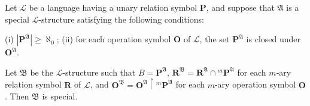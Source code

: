 Let $\mathcal{L}$ be a language having a unary relation symbol $\mathbf{P}$, and suppose that $\mathfrak{A}$ is a special $\mathcal{L}$-structure satisfying the following conditions:

(i) $|\mathbf{P}^{\mathfrak{A}}| \geq \aleph_0$;
(ii) for each operation symbol $\mathbf{O}$ of $\mathcal{L}$, the set $\mathbf{P}^{\mathfrak{A}}$ is closed under $\mathbf{O}^{\mathfrak{A}}$.

Let $\mathfrak{B}$ be the $\mathcal{L}$-structure such that $B = \mathbf{P}^{\mathfrak{A}}$, $\mathbf{R}^{\mathfrak{B}} = \mathbf{R}^{\mathfrak{A}} \cap {}^m\mathbf{P}^{\mathfrak{A}}$ for each $m$-ary relation symbol $\mathbf{R}$ of $\mathcal{L}$, and $\mathbf{O}^{\mathfrak{B}} = \mathbf{O}^{\mathfrak{A}} \upharpoonright {}^m\mathbf{P}^{\mathfrak{A}}$ for each $m$-ary operation symbol $\mathbf{O}$. Then $\mathfrak{B}$ is special.
